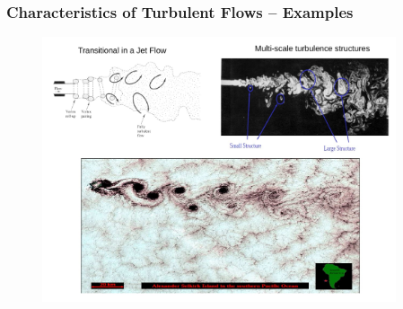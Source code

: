\documentclass[10pt,compress]{beamer}
\begin{document}
\begin{frame}
 \frametitle{Characteristics of Turbulent Flows -- Examples}

   \begin{figure}%
    \begin{center}
     \includegraphics[width=12.cm, height=7.8cm, clip]{./Figs/Turbulence_Examples}
    \end{center}
   \end{figure}    
\end{frame}

\end{document}
